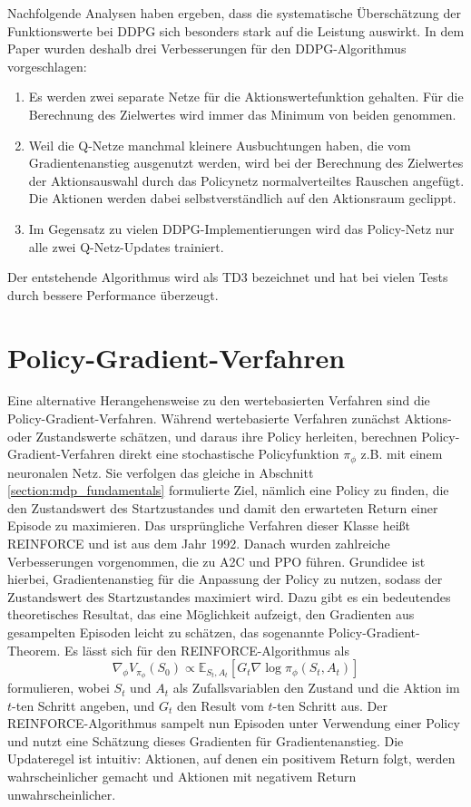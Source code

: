 Nachfolgende Analysen haben ergeben, dass die systematische Überschätzung der Funktionswerte bei DDPG sich besonders stark auf die Leistung auswirkt.
In dem Paper \cite{DBLP:journals/corr/abs-1802-09477} wurden deshalb drei Verbesserungen für den DDPG-Algorithmus vorgeschlagen:
\begin{enumerate}
	\item Es werden zwei separate Netze für die Aktionswertefunktion gehalten.
	Für die Berechnung des Zielwertes wird immer das Minimum von beiden genommen.
	\item Weil die Q-Netze manchmal kleinere Ausbuchtungen haben, die vom Gradientenanstieg ausgenutzt werden, wird bei der Berechnung des Zielwertes der Aktionsauswahl durch das Policynetz normalverteiltes Rauschen angefügt.
	Die Aktionen werden dabei selbstverständlich auf den Aktionsraum geclippt.
	\item Im Gegensatz zu vielen DDPG-Implementierungen wird das Policy-Netz nur alle zwei Q-Netz-Updates trainiert.
\end{enumerate}
Der entstehende Algorithmus wird als TD3 bezeichnet und hat bei vielen Tests durch bessere Performance überzeugt.

\section{Policy-Gradient-Verfahren}
Eine alternative Herangehensweise zu den wertebasierten Verfahren sind die Policy-Gradient-Verfahren.
Während wertebasierte Verfahren zunächst Aktions- oder Zustandswerte schätzen, und daraus ihre Policy herleiten, berechnen Policy-Gradient-Verfahren direkt eine stochastische Policyfunktion $\pi_\phi$ z.B. mit einem neuronalen Netz.
Sie verfolgen das gleiche in Abschnitt \ref{section:mdp_fundamentals} formulierte Ziel, nämlich eine Policy zu finden, die den Zustandswert des Startzustandes und damit den erwarteten Return einer Episode zu maximieren.
Das ursprüngliche Verfahren dieser Klasse heißt REINFORCE \cite{10.1007/BF00992696} und ist aus dem Jahr 1992.
Danach wurden zahlreiche Verbesserungen vorgenommen, die zu A2C und PPO führen.
Grundidee ist hierbei, Gradientenanstieg für die Anpassung der Policy zu nutzen, sodass der Zustandswert des Startzustandes maximiert wird.
Dazu gibt es ein bedeutendes theoretisches Resultat, das eine Möglichkeit aufzeigt, den Gradienten aus gesampelten Episoden leicht zu schätzen, das sogenannte Policy-Gradient-Theorem.
Es lässt sich für den REINFORCE-Algorithmus als
\begin{equation}
	\nabla_\phi V_{\pi_\phi}(S_0) \propto \mathbb{E}_{S_t, A_t}\left[G_t \nabla\log{\pi_\phi(S_t, A_t)}\right]
\end{equation}
formulieren, wobei $S_t$ und $A_t$ als Zufallsvariablen den Zustand und die Aktion im $t$-ten Schritt angeben, und $G_t$ den Result vom $t$-ten Schritt aus.
Der REINFORCE-Algorithmus sampelt nun Episoden unter Verwendung einer Policy und nutzt eine Schätzung dieses Gradienten für Gradientenanstieg.
Die Updateregel ist intuitiv: Aktionen, auf denen ein positivem Return folgt, werden wahrscheinlicher gemacht und Aktionen mit negativem Return unwahrscheinlicher.

